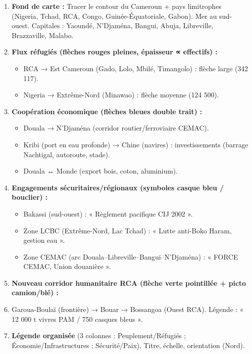 \documentclass[11pt]{article}
\begin{document}
\begin{exoresolu}
\begin{methode}
\begin{enumerate}
    \item \textbf{Fond de carte :} Tracer le contour du Cameroun + pays limitrophes (Nigeria, Tchad, RCA, Congo, Guinée-Équatoriale, Gabon). Mer au sud-ouest. Capitales : Yaoundé, N'Djaména, Bangui, Abuja, Libreville, Brazzaville, Malabo.
    \item \textbf{Flux réfugiés (flèches rouges pleines, épaisseur ∝ effectifs) :}
    \begin{itemize}
        \item RCA → Est Cameroun (Gado, Lolo, Mbilé, Timangolo) : flèche large (342 117).
        \item Nigeria → Extrême-Nord (Minawao) : flèche moyenne (124 500).
    \end{itemize}
    \item \textbf{Coopération économique (flèches bleues double trait) :}
    \begin{itemize}
        \item Douala → N'Djaména (corridor routier/ferroviaire CEMAC).
        \item Kribi (port en eau profonde) → Chine (navires) : investissements (barrage Nachtigal, autoroute, stade).
        \item Douala ↔ Monde (export bois, coton, aluminium).
    \end{itemize}
    \item \textbf{Engagements sécuritaires/régionaux (symboles casque bleu / bouclier) :}
    \begin{itemize}
        \item Bakassi (sud-ouest) : « Règlement pacifique CIJ 2002 ».
        \item Zone LCBC (Extrême-Nord, Lac Tchad) : « Lutte anti-Boko Haram, gestion eau ».
        \item Zone CEMAC (arc Douala–Libreville–Bangui–N'Djaména) : « FORCE CEMAC, Union douanière ».
    \end{itemize}
    \item \textbf{Nouveau corridor humanitaire RCA (flèche verte pointillée + picto camion/blé) :}
    \item Garoua-Boulaï (frontière) → Bouar → Bossangoa (Ouest RCA). Légende : « 12 000 t vivres PAM / 750 casques bleus ».
    \item \textbf{Légende organisée} (3 colonnes : Peuplement/Réfugiés ; Économie/Infrastructures ; Sécurité/Paix). Titre, échelle, orientation (Nord).
\end{enumerate}
\end{methode}


\end{exoresolu}
\end{document}
